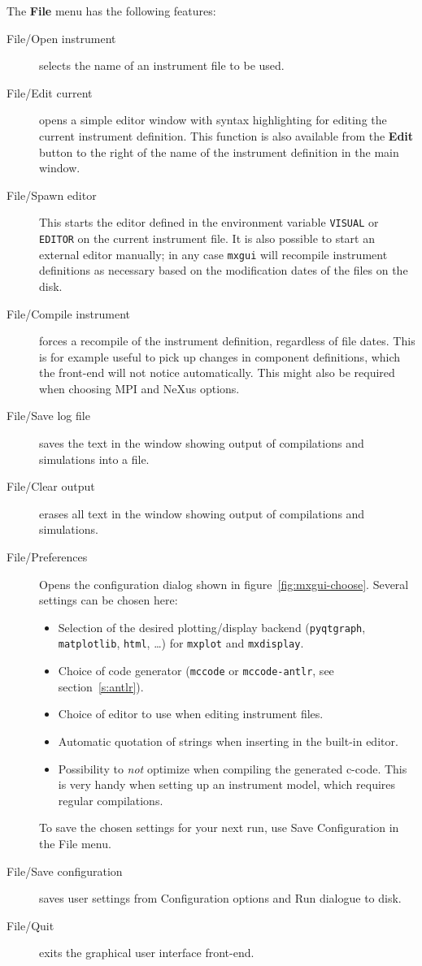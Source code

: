 The \textbf{File} menu has the following features:
\begin{description}
\item[File/Open instrument] selects the name of an instrument file to be used.
\item[File/Edit current] opens a simple editor window with \MCX syntax
  highlighting for editing the
  current instrument definition. This function is also available from
  the \textbf{Edit} button to the right of the name of the instrument definition in
  the main window.
\item[File/Spawn editor] This starts the editor defined in the environment
  variable \verb+VISUAL+ or \verb+EDITOR+ on the current instrument
  file. It is also possible to start an external editor manually; in any
  case \verb+mxgui+ will recompile instrument definitions as necessary based on
  the modification dates of the files on the disk.
\item[File/Compile instrument] forces a recompile of the instrument definition,
  regardless of file dates. This is for example useful to pick up changes in
  component definitions, which the front-end will not notice automatically. This
  might also be required when choosing MPI  and NeXus options.
\item[File/Save log file] saves the text in the window showing output of
  compilations and simulations into a file.
\item[File/Clear output] erases all text in the window showing output of
  compilations and simulations.
  \item[File/Preferences] Opens the configuration dialog shown in
  figure~\ref{fig:mxgui-choose}. Several settings can be chosen here:
\begin{itemize}
  \item Selection of the desired plotting/display backend (\texttt{pyqtgraph},
    \texttt{matplotlib}, \texttt{html}, \ldots) for \texttt{mxplot} and
    \texttt{mxdisplay}.
  \item Choice of code generator (\texttt{mccode} or \texttt{mccode-antlr},
    see section~\ref{s:antlr}).
  \item Choice of editor to use when editing instrument files.
  \item Automatic quotation of strings when inserting in the built-in
    editor.
  \item Possibility to \emph{not} optimize when compiling the generated
    c-code. This is very handy when setting up an instrument model, which
    requires regular compilations.
\end{itemize}
To save the chosen settings for your next \MCX run, use Save
Configuration in the File menu.
\item[File/Save configuration] saves user settings from Configuration
  options and Run dialogue to disk.
\item[File/Quit] exits the graphical user interface front-end.
\end{description}

